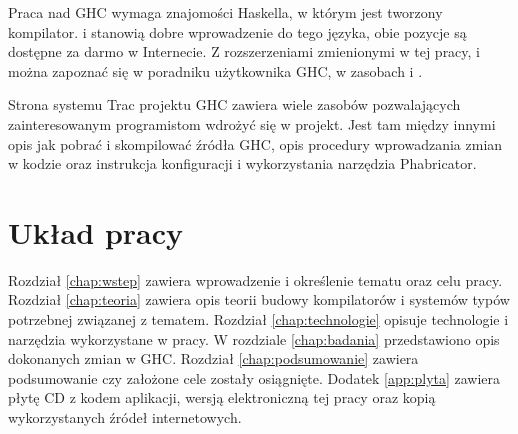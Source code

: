 Praca nad GHC wymaga znajomości Haskella, w którym jest tworzony
kompilator. \cite{LearnYouAHaskell} i \cite{RealWorldHaskell} stanowią dobre
wprowadzenie do tego języka, obie pozycje są dostępne za darmo w Internecie. Z
rozszerzeniami zmienionymi w tej pracy,  i
 można zapoznać się w poradniku użytkownika GHC, w
zasobach \cite{GuideTypeFamilies} i \cite{GuidePartialTypeSignatures}.

Strona systemu Trac projektu GHC zawiera wiele zasobów pozwalających
zainteresowanym programistom wdrożyć się w projekt. Jest tam między innymi opis
jak pobrać i skompilować źródła GHC\cite{WikiNewcomers}, opis procedury
wprowadzania zmian w kodzie\cite{WikiFixingBugs} oraz instrukcja konfiguracji i
wykorzystania narzędzia Phabricator\cite{WikiPhabricator}.

\section{Układ pracy}\label{sec:uklad_pracy}

Rozdział \ref{chap:wstep} zawiera wprowadzenie i określenie tematu oraz celu
pracy. Rozdział \ref{chap:teoria} zawiera opis teorii budowy kompilatorów i
systemów typów potrzebnej związanej z tematem. Rozdział \ref{chap:technologie}
opisuje technologie i narzędzia wykorzystane w pracy. W rozdziale
\ref{chap:badania} przedstawiono opis dokonanych zmian w GHC. Rozdział
\ref{chap:podsumowanie} zawiera podsumowanie czy założone cele zostały
osiągnięte. Dodatek \ref{app:plyta} zawiera płytę CD z kodem aplikacji,
wersją elektroniczną tej pracy oraz kopią wykorzystanych źródeł internetowych.
